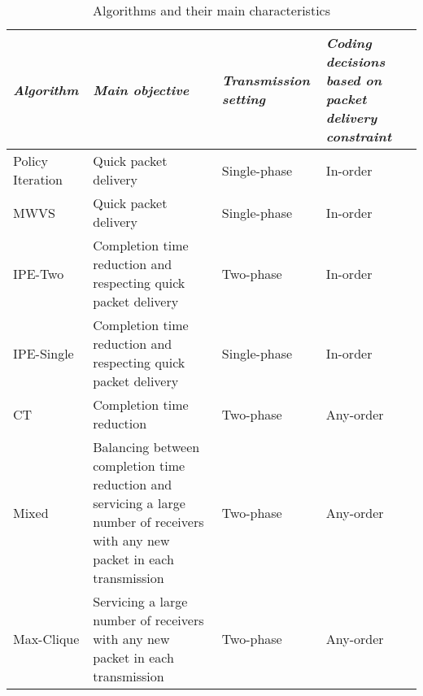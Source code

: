 \documentclass[12pt, peerreview, onecolumn]{IEEEtran}
\begin{document}
\begin{table}\caption{Algorithms and their main characteristics}
 \centering
    \begin{tabular}{|l|p{6cm} |p{2.4cm}  |p{4cm} |}
    \hline
    \textit{Algorithm} &  \textit{Main objective} &  \textit{Transmission setting} &  \textit{Coding decisions based on packet delivery constraint} \\ \hline
    Policy Iteration & Quick packet delivery  &  Single-phase  & In-order \\ \hline
    MWVS & Quick packet delivery &  Single-phase  & In-order \\ \hline
    IPE-Two \cite{wanginstantly} & Completion time reduction  and respecting quick packet delivery &  Two-phase  & In-order \\ \hline
    IPE-Single & Completion time reduction and respecting quick packet delivery &  Single-phase  & In-order \\ \hline
    CT \cite{sorour2012completion}& Completion time reduction &  Two-phase  &Any-order \\ \hline
    Mixed \cite{aboutorabenabling}& Balancing between  completion time reduction and servicing a large number of receivers with any new packet in each transmission&  Two-phase  &Any-order \\ \hline
    Max-Clique \cite{le2013instantly}& Servicing a large  number of receivers with any new packet in each transmission&  Two-phase  & Any-order \\ \hline

    \end{tabular}
\end{table}
\end{document}
